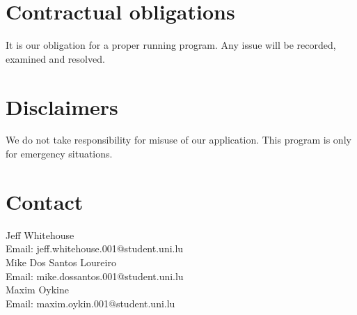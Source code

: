 \section{Contractual obligations}

It is our obligation for a proper running program. Any issue will be recorded,
examined and resolved.

\section{Disclaimers}

We do not take responsibility for misuse of our application. This program is
only for emergency situations.

\section{Contact}
\begin {flushleft}
Jeff Whitehouse
\\[5pt]
Email: jeff.whitehouse.001@student.uni.lu
\\[8pt]
Mike Dos Santos Loureiro
\\[5pt]
Email: mike.dossantos.001@student.uni.lu
\\[8pt]
Maxim Oykine
\\[5pt]
Email: maxim.oykin.001@student.uni.lu
\end {flushleft}